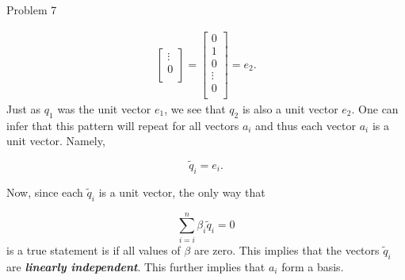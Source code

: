 \begin{problem}{Problem 7}
\begin{Highlight}[Solution]
\begin{align}
\begin{bmatrix}
                \vdots \\
                0 \\
            \end{bmatrix}
            =
            \begin{bmatrix}
                0 \\
                1 \\
                0 \\
                \vdots \\
                0 \\
            \end{bmatrix}
            = e_{2}.
        \end{align}
        Just as $q_{1}$ was the unit vector $e_{1}$, we see that $q_{2}$ is also a unit vector $e_{2}$. One can infer that this pattern will repeat for all vectors $a_{i}$ and thus each vector $a_{i}$ 
        is a unit vector. Namely,

        \begin{equation}
            \tilde{q}_{i} = e_{i}.
        \end{equation}

        Now, since each $\tilde{q}_{i}$ is a unit vector, the only way that 

        \begin{equation}
            \sum_{i = i}^{n} \beta_{i}\tilde{q}_{i} = 0
        \end{equation}
        is a true statement is if all values of $\beta$ are zero. This implies that the vectors $\tilde{q}_{i}$ are \textit{\textbf{linearly independent}}. This further implies that $a_{i}$ form a basis.
    \end{Highlight}
\end{problem}


